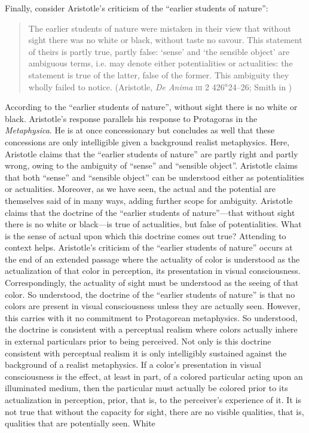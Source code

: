 Finally, consider Aristotle's criticism of the ``earlier students of nature'':
\begin{quote}
	The earlier students of nature were mistaken in their view that without sight there was no white or black, without taste no savour. This statement of theirs is partly true, partly false: ‘sense’ and ‘the sensible object’ are ambiguous terms, i.e. may denote either potentialities or actualities: the statement is true of the latter, false of the former. This ambiguity they wholly failed to notice. (Aristotle, \emph{De Anima} \textsc{iii} 2 426\( ^{a} \)24--26; Smith in \citealt[46--47]{Barnes:1984uq})
\end{quote}
According to the ``earlier students of nature'', without sight there is no white or black. Aristotle's response parallels his response to Protagoras in the \emph{Metaphysica}. He is at once concessionary but concludes as well that these concessions are only intelligible given a background realist metaphysics. Here, Aristotle claims that the ``earlier students of nature'' are partly right and partly wrong, owing to the ambiguity of ``sense'' and ``sensible object''. Aristotle claims that both ``sense'' and ``sensible object'' can be understood either as potentialities or actualities. Moreover, as we have seen, the actual and the potential are themselves said of in many ways, adding further scope for ambiguity. Aristotle claims that the doctrine of the ``earlier students of nature''---that without sight there is no white or black---is true of actualities, but false of potentialities. What is the sense of actual upon which this doctrine comes out true? Attending to context helps. Aristotle's criticism of the ``earlier students of nature'' occurs at the end of an extended passage where the actuality of color is understood as the actualization of that color in perception, its presentation in visual consciousness. Correspondingly, the actuality of sight must be understood as the seeing of that color. So understood, the doctrine of the ``earlier students of nature'' is that no colors are present in visual consciousness unless they are actually seen. However, this carries with it no commitment to Protagorean metaphysics. So understood, the doctrine is consistent with a perceptual realism where colors actually inhere in external particulars prior to being perceived. Not only is this doctrine consistent with perceptual realism it is only intelligibly sustained against the background of a realist metaphysics. If a color's presentation in visual consciousness is the effect, at least in part, of a colored particular acting upon an illuminated medium, then the particular must actually be colored prior to its actualization in perception, prior, that is, to the perceiver's experience of it. It is not true that without the capacity for sight, there are no visible qualities, that is, qualities that are potentially seen. White 
